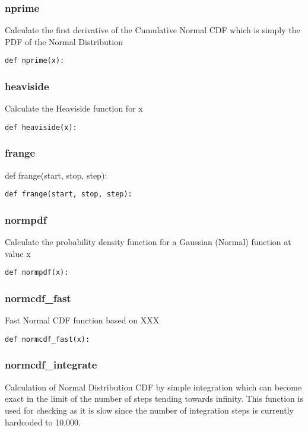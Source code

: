 \documentclass[twoside,11pt]{book}
\begin{document}
\subsubsection*{{\bf nprime}}
Calculate the first derivative of the Cumulative Normal CDF which is simply the PDF of the Normal Distribution  

\begin{lstlisting}
def nprime(x):
\end{lstlisting}

\subsubsection*{{\bf heaviside}}
Calculate the Heaviside function for x  

\begin{lstlisting}
def heaviside(x):
\end{lstlisting}

\subsubsection*{{\bf frange}}
def frange(start, stop, step): 

\begin{lstlisting}
def frange(start, stop, step):
\end{lstlisting}

\subsubsection*{{\bf normpdf}}
Calculate the probability density function for a Gaussian (Normal) function at value x 

\begin{lstlisting}
def normpdf(x):
\end{lstlisting}

\subsubsection*{{\bf normcdf\_fast}}
Fast Normal CDF function based on XXX  

\begin{lstlisting}
def normcdf_fast(x):
\end{lstlisting}

\subsubsection*{{\bf normcdf\_integrate}}
Calculation of Normal Distribution CDF by simple integration which can become exact in the limit of the number of steps tending towards infinity. This function is used for checking as it is slow since the number of integration steps is currently hardcoded to 10,000. 
\end{document}

